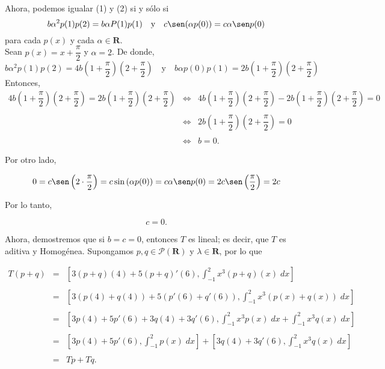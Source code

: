 \begin{enumerate}[\bfseries 1.]
	Ahora, podemos igualar (1) y (2) si y sólo si 
	$$b\alpha^2p(1)p(2)=b\alpha P(1) p(1) \quad \mbox{y} \quad c\sen(\alpha p(0))=c\alpha\sen p(0)$$
	para cada $p(x)$ y cada $\alpha \in \textbf{R}.$\\

	Sean $p(x)=x+\dfrac{\pi}{2}$ y $\alpha=2$. De donde,
	$$b\alpha^2p(1)p(2)=4b\left(1+\dfrac{\pi}{2}\right)\left(2+\dfrac{\pi}{2}\right)\quad \mbox{y}\quad b\alpha p(0)p(1)=2b\left(1+\dfrac{\pi}{2}\right)\left(2+\dfrac{\pi}{2}\right)$$
	Entonces,
	$$
	\begin{array}{rcl}
	    4b\left(1+\dfrac{\pi}{2}\right)\left(2+\dfrac{\pi}{2}\right)=2b\left(1+\dfrac{\pi}{2}\right)\left(2+\dfrac{\pi}{2}\right) &\Leftrightarrow& 4b\left(1+\dfrac{\pi}{2}\right)\left(2+\dfrac{\pi}{2}\right)-2b\left(1+\dfrac{\pi}{2}\right)\left(2+\dfrac{\pi}{2}\right)=0\\\\
																      &\Leftrightarrow& 2b \left(1+\dfrac{\pi}{2}\right)\left(2+\dfrac{\pi}{2}\right)=0\\\\
																      &\Leftrightarrow& b=0.
	\end{array}
	$$

	Por otro lado,

	$$0= c\sen\left(2\cdot \dfrac{\pi}{2}\right)=c\sin\left(\alpha p(0)\right) = c\alpha \sen p(0)=2c\sen\left(\dfrac{\pi}{2}\right)=2c$$

	Por lo tanto, 

	$$c=0.$$

	Ahora, demostremos que si $b=c=0$, entonces $T$ es lineal; es decir, que $T$ es aditiva y Homogénea. Supongamos $p,q\in \mathcal{P}(\textbf{R})$ y $\lambda \in \textbf{R}$, por lo que 

	$$
	\begin{array}{rcl}
	    T(p+q) &=& \left[3(p+q)(4)+5(p+q)'(6),\displaystyle\int_{-1}^2 x^3(p+q)(x)\; dx\right]\\\\
		   &=& \left[3\left(p(4)+q(4)\right)+5\left(p'(6)+q'(6)\right),\displaystyle\int_{-1}^2x^3\left(p(x)+q(x)\right)\; dx\right]\\\\
		   &=& \left[3p(4)+5p'(6)+3q(4)+3q'(6),\displaystyle\int_{-1}^2 x^3 p(x)\; dx +\int_{-1}^2 x^3q(x)\; dx\right]\\\\
		   &=& \left[3p(4)+5p'(6),\displaystyle\int_{-1}^2 p(x)\; dx\right]+\left[3q(4)+3q'(6),\displaystyle\int_{-1}^2 x^3q(x)\; dx\right]\\\\
		   &=& Tp+Tq.
	\end{array}
	$$


\end{enumerate}
